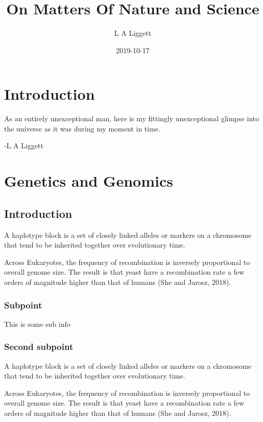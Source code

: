 \documentclass[]{book}
\title{On Matters Of Nature and Science}
\author{L A Liggett}
\date{2019-10-17}
\begin{document}
\maketitle

{
\setcounter{tocdepth}{1}
\tableofcontents
}
\chapter{Introduction}\label{introduction}

As an entirely unexceptional man, here is my fittingly unexceptional
glimpse into the universe as it was during my moment in time.

-L A Liggett

\chapter{Genetics and Genomics}\label{g2}

\section{Introduction}\label{introduction-1}

A haplotype block is a set of closely linked alleles or markers on a
chromosome that tend to be inherited together over evolutionary time.

Across Eukaryotes, the frequency of recombination is inversely
proportional to overall genome size. The result is that yeast have a
recombination rate a few orders of magnitude higher than that of humans
(She and Jarosz, 2018).

\subsection{Subpoint}\label{subpoint}

This is some sub info

\subsection{Second subpoint}\label{second-subpoint}

A haplotype block is a set of closely linked alleles or markers on a
chromosome that tend to be inherited together over evolutionary time.

Across Eukaryotes, the frequency of recombination is inversely
proportional to overall genome size. The result is that yeast have a
recombination rate a few orders of magnitude higher than that of humans
(She and Jarosz, 2018).
\end{document}
